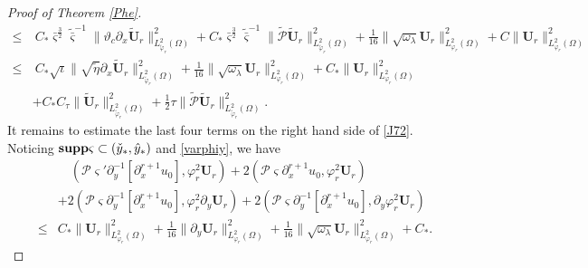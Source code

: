 \documentclass{amsart}
\numberwithin{equation}{section}
\begin{document}
\begin{proof}[Proof of Theorem \ref{Phe}]
\begin{align}
\leq&~C_{*}\bar{\varsigma}^{\frac{3}{2}}\tilde{\bar{\varsigma}}^{-1}
           \|\vartheta_{c}\partial_{x}\tilde{\mathbf{U}}_{r}\|_{L_{\tilde{\varphi}_{r}}^{2}(\Omega)}^{2}
     +C_{*}\bar{\varsigma}^{\frac{3}{2}}\tilde{\bar{\varsigma}}^{-1}\|\tilde{\mathcal{P}}\tilde{\mathbf{U}}_{r}\|_{L_{\tilde{\varphi}_{r}}^{2}(\Omega)}^{2}
     +\frac{1}{16}\|\sqrt{\omega_{\lambda}}\mathbf{U}_{r}\|_{L_{\varphi_{r}}^{2}(\Omega)}^{2}
     +C\|\mathbf{U}_{r}\|_{L_{\varphi_{r}}^{2}(\Omega)}^{2}\nonumber\\
\leq&~C_{*}\sqrt{\iota}\|\sqrt{\tilde{\eta}}\partial_{x}\tilde{\mathbf{U}}_{r}\|_{L_{\tilde{\varphi}_{r}}^{2}(\Omega)}^{2}
     +\frac{1}{16}\|\sqrt{\omega_{\lambda}}\mathbf{U}_{r}\|_{L_{\varphi_{r}}^{2}(\Omega)}^{2}
     +C_{*}\|\mathbf{U}_{r}\|_{L_{\varphi_{r}}^{2}(\Omega)}^{2}\nonumber\\
    &+C_{*}C_{\tau}\|\tilde{\mathbf{U}}_{r}\|_{L_{\tilde{\varphi}_{r}}^{2}(\Omega)}^{2}
     +\frac{1}{2}\tau\|\tilde{\mathcal{P}}\tilde{\mathbf{U}}_{r}\|_{L_{\tilde{\varphi}_{r}}^{2}(\Omega)}^{2}.\nonumber
\end{align}
It remains to estimate the last four terms on the right hand side of \eqref{J72}. Noticing ${\bf supp}\varsigma \subset(\check{y}_{*},\hat{y}_{*})$ and \eqref{varphiy}, we have
\begin{align}\label{J725}
&\quad(\mathcal{P}\varsigma'\partial_{y}^{-1}[\partial_{x}^{r+1}u_{0}],\varphi_{r}^{2}\mathbf{U}_{r})
+2(\mathcal{P}\varsigma\partial_{x}^{r+1}u_{0},\varphi_{r}^{2}\mathbf{U}_{r})\\
&+2(\mathcal{P}\varsigma\partial_{y}^{-1}[\partial_{x}^{r+1}u_{0}],\varphi_{r}^{2}\partial_{y}\mathbf{U}_{r})
+2(\mathcal{P}\varsigma\partial_{y}^{-1}[\partial_{x}^{r+1}u_{0}],\partial_{y}\varphi_{r}^{2}\mathbf{U}_{r})\nonumber\\
\leq& C_{*}\|\mathbf{U}_{r}\|_{L_{\varphi_{r}}^{2}(\Omega)}^{2}
    +\frac{1}{16}\|\partial_{y}\mathbf{U}_{r}\|_{L_{\varphi_{r}}^{2}(\Omega)}^{2}
    +\frac{1}{16}\|\sqrt{\omega_{\lambda}}\mathbf{U}_{r}\|_{L_{\varphi_{r}}^{2}(\Omega)}^{2}
    +C_{*}.\nonumber
\end{align}


\end{proof}
\end{document}
